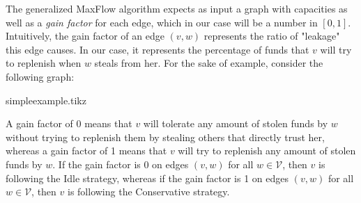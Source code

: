 The generalized MaxFlow algorithm expects as input a graph with capacities as well as a \textit{gain factor} for each edge,
which in our case will be a number in $\left[0, 1\right]$. Intuitively, the gain factor of an edge $\left(v, w\right)$
represents the ratio of "leakage" this edge causes. In our case, it represents the percentage of funds that $v$ will try to
replenish when $w$ steals from her. For the sake of example, consider the following graph:


{simpleexample.tikz}

A gain factor of 0 means that $v$ will tolerate any amount of stolen funds by $w$ without trying to replenish them by stealing
others that directly trust her, whereas a gain factor of 1 means that $v$ will try to replenish any amount of stolen funds by
$w$. If the gain factor is 0 on edges $\left(v, w\right)$ for all $w \in \mathcal{V}$, then $v$ is following the Idle
strategy, whereas if the gain factor is 1 on edges $\left(v, w\right)$ for all $w \in \mathcal{V}$, then $v$ is following the
Conservative strategy.

